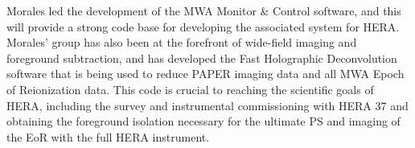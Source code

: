 \documentclass[11pt]{article}
\begin{document}
Morales led the development of the MWA Monitor \& Control software, and this will provide a strong code base for developing the associated system for HERA. Morales' group has also been at the forefront of wide-field imaging and foreground subtraction, and has developed the Fast Holographic Deconvolution software that is being used to reduce PAPER imaging data and all MWA Epoch of Reionization data. This code is crucial to reaching the scientific goals of HERA, including the survey and instrumental commissioning with HERA 37 and obtaining the foreground isolation necessary for the ultimate PS and imaging of the EoR with the full HERA instrument.
\end{document}
